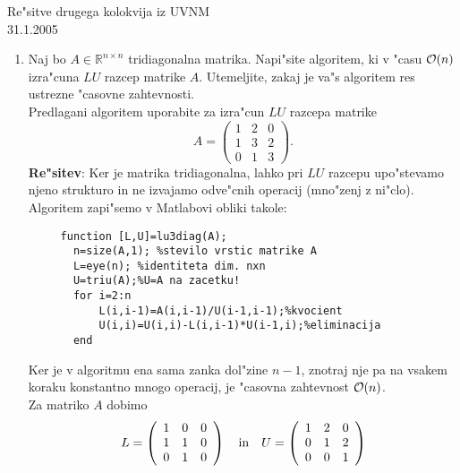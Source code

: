 \documentclass[12pt,a4paper]{article}
\def\RR{\mathbb{R}}
\begin{document}
\begin{center}
  {\large Re"sitve drugega kolokvija iz UVNM\\
    31.1.2005\\
    }
\end{center}

\begin{enumerate}

  \item Naj bo $A\in\RR^{n\times n}$ tridiagonalna matrika. 
    Napi"site algoritem, ki v "casu ${\cal O}(n)$ izra"cuna
    $LU$ razcep matrike $A$. Utemeljite, zakaj je va"s
    algoritem res ustrezne "casovne zahtevnosti.\\
    Predlagani algoritem uporabite za izra"cun $LU$ razcepa matrike
    $$A=\left(
      \begin{array}{ccc}
        1 & 2 & 0\\
        1 & 3 & 2\\
        0 & 1 & 3
      \end{array}
      \right).$$
   {\bf Re"sitev}: Ker je matrika tridiagonalna, lahko pri $LU$
   razcepu upo\-"ste\-va\-mo njeno strukturo in ne izvajamo odve"cnih operacij
   (mno"zenj z ni"clo). Algoritem zapi"semo v Matlabovi obliki takole:
   \begin{verbatim}
     function [L,U]=lu3diag(A);
       n=size(A,1); %stevilo vrstic matrike A
       L=eye(n); %identiteta dim. nxn
       U=triu(A);%U=A na zacetku!
       for i=2:n
           L(i,i-1)=A(i,i-1)/U(i-1,i-1);%kvocient
           U(i,i)=U(i,i)-L(i,i-1)*U(i-1,i);%eliminacija
       end
   \end{verbatim}
   Ker je v algoritmu ena sama zanka dol"zine $n-1$, znotraj nje
   pa na vsakem koraku konstantno mnogo operacij, je "casovna
   zahtevnost ${\cal O}(n)$.\\
   Za matriko $A$ dobimo
   $$L=\left(
         \begin{array}{ccc}
           1 & 0 & 0\\
           1 & 1 & 0\\
           0 & 1 & 0
         \end{array}
      \right) \quad {\rm in} \quad 
      U=\left(
         \begin{array}{ccc}
           1 & 2 & 0\\
           0 & 1 & 2\\
           0 & 0 & 1
         \end{array}
      \right)$$
  

\end{enumerate}
\end{document}
